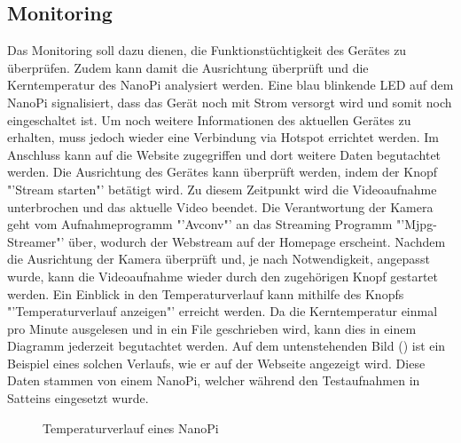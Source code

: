 \subsection{Monitoring}
Das Monitoring soll dazu dienen, die Funktionstüchtigkeit des Gerätes zu überprüfen. Zudem kann damit die Ausrichtung überprüft und die Kerntemperatur des NanoPi analysiert werden. Eine blau blinkende LED auf dem NanoPi signalisiert, dass das Gerät noch mit Strom versorgt wird und somit noch eingeschaltet ist. Um noch weitere Informationen des aktuellen Gerätes zu erhalten, muss jedoch wieder eine Verbindung via Hotspot errichtet werden. Im Anschluss kann auf die Website zugegriffen und dort weitere Daten begutachtet werden. Die Ausrichtung des Gerätes kann überprüft werden, indem der Knopf "'Stream starten"' betätigt wird. Zu diesem Zeitpunkt wird die Videoaufnahme unterbrochen und das aktuelle Video beendet. Die Verantwortung der Kamera geht vom Aufnahmeprogramm "'Avconv"' an das Streaming Programm "'Mjpg-Streamer"' über, wodurch der Webstream auf der Homepage erscheint. Nachdem die Ausrichtung der Kamera überprüft und, je nach Notwendigkeit, angepasst wurde, kann die Videoaufnahme wieder durch den zugehörigen Knopf gestartet werden. Ein Einblick in den Temperaturverlauf kann mithilfe des Knopfs "'Temperaturverlauf anzeigen"' erreicht werden. Da die Kerntemperatur einmal pro Minute ausgelesen und in ein File geschrieben wird, kann dies in einem Diagramm jederzeit begutachtet werden. Auf dem untenstehenden Bild () ist ein Beispiel eines solchen Verlaufs, wie er auf der Webseite angezeigt wird. Diese Daten stammen von einem NanoPi, welcher während den Testaufnahmen in Satteins eingesetzt wurde.

\begin{figure}[H]
  \centering
  \caption{Temperaturverlauf eines NanoPi}
  \label{bTemperature}
\end{figure} 